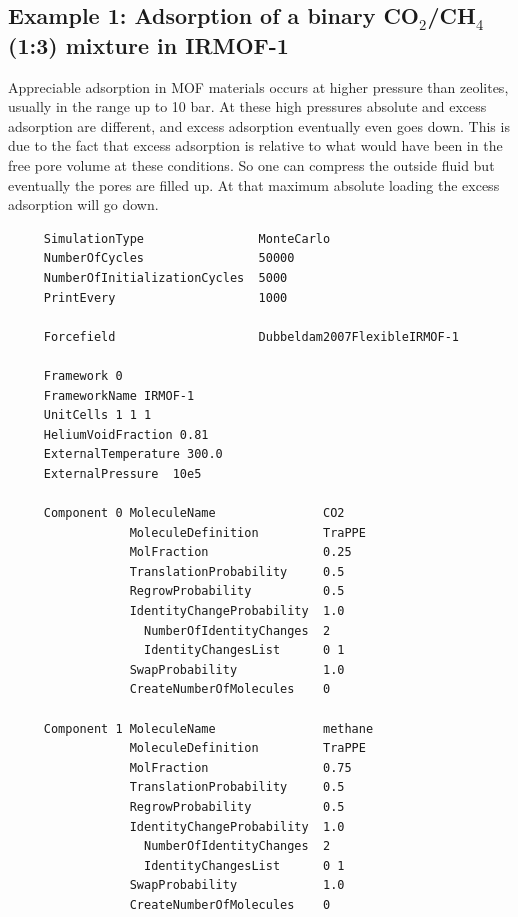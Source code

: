 \subsection*{Example 1: Adsorption of a binary CO$_2$/CH$_4$ (1:3) mixture in IRMOF-1}

Appreciable adsorption in MOF materials occurs at higher pressure than zeolites, usually in the range up to 10 bar. At these high pressures
absolute and excess adsorption are different, and excess adsorption eventually even goes down. This is due to the fact that excess adsorption is relative
to what would have been in the free pore volume at these conditions. So one can compress the outside fluid but eventually the pores are filled up. At that
maximum absolute loading the excess adsorption will go down.
\begin{tiny}
\begin{verbatim}
     SimulationType                MonteCarlo
     NumberOfCycles                50000
     NumberOfInitializationCycles  5000
     PrintEvery                    1000
     
     Forcefield                    Dubbeldam2007FlexibleIRMOF-1
     
     Framework 0
     FrameworkName IRMOF-1
     UnitCells 1 1 1
     HeliumVoidFraction 0.81
     ExternalTemperature 300.0
     ExternalPressure  10e5
     
     Component 0 MoleculeName               CO2
                 MoleculeDefinition         TraPPE
                 MolFraction                0.25
                 TranslationProbability     0.5
                 RegrowProbability          0.5
                 IdentityChangeProbability  1.0
                   NumberOfIdentityChanges  2
                   IdentityChangesList      0 1
                 SwapProbability            1.0
                 CreateNumberOfMolecules    0
     
     Component 1 MoleculeName               methane
                 MoleculeDefinition         TraPPE
                 MolFraction                0.75
                 TranslationProbability     0.5
                 RegrowProbability          0.5
                 IdentityChangeProbability  1.0
                   NumberOfIdentityChanges  2
                   IdentityChangesList      0 1
                 SwapProbability            1.0
                 CreateNumberOfMolecules    0
\end{verbatim}
\end{tiny}

